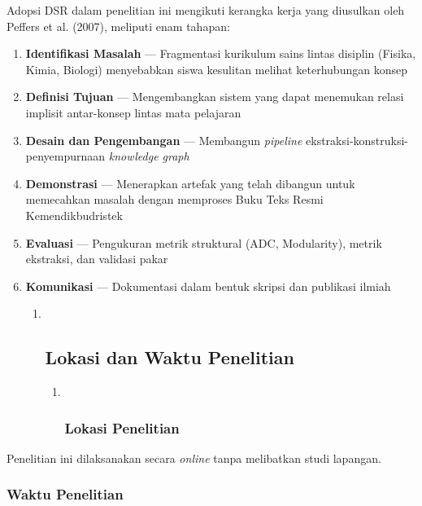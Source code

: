 \documentclass[
]{article}
\begin{document}
Adopsi DSR dalam penelitian ini mengikuti kerangka kerja yang diusulkan
oleh Peffers et al. (2007), meliputi enam tahapan:

\begin{enumerate}
\def\labelenumi{\arabic{enumi}.}
\item
  \textbf{Identifikasi Masalah} --- Fragmentasi kurikulum sains lintas
  disiplin (Fisika, Kimia, Biologi) menyebabkan siswa kesulitan melihat
  keterhubungan konsep
\item
  \textbf{Definisi Tujuan} --- Mengembangkan sistem yang dapat menemukan
  relasi implisit antar-konsep lintas mata pelajaran
\item
  \textbf{Desain dan Pengembangan} --- Membangun \emph{pipeline}
  ekstraksi-konstruksi-penyempurnaan \emph{knowledge graph}
\item
  \textbf{Demonstrasi} --- Menerapkan artefak yang telah dibangun untuk
  memecahkan masalah dengan memproses Buku Teks Resmi Kemendikbudristek
\item
  \textbf{Evaluasi} --- Pengukuran metrik struktural (ADC, Modularity),
  metrik ekstraksi, dan validasi pakar
\item
  \textbf{Komunikasi} --- Dokumentasi dalam bentuk skripsi dan publikasi
  ilmiah

  \begin{enumerate}
  \def\labelenumii{\arabic{enumii}.}
  \item ~
    \hypertarget{lokasi-dan-waktu-penelitian}{%
    \subsection{Lokasi dan Waktu
    Penelitian}\label{lokasi-dan-waktu-penelitian}}

    \begin{enumerate}
    \def\labelenumiii{\arabic{enumiii}.}
    \item ~
      \hypertarget{lokasi-penelitian}{%
      \subsubsection{Lokasi Penelitian}\label{lokasi-penelitian}}
    \end{enumerate}
  \end{enumerate}
\end{enumerate}

Penelitian ini dilaksanakan secara \emph{online} tanpa melibatkan studi
lapangan.

\hypertarget{waktu-penelitian}{%
\subsubsection{Waktu Penelitian}\label{waktu-penelitian}}
\end{document}
